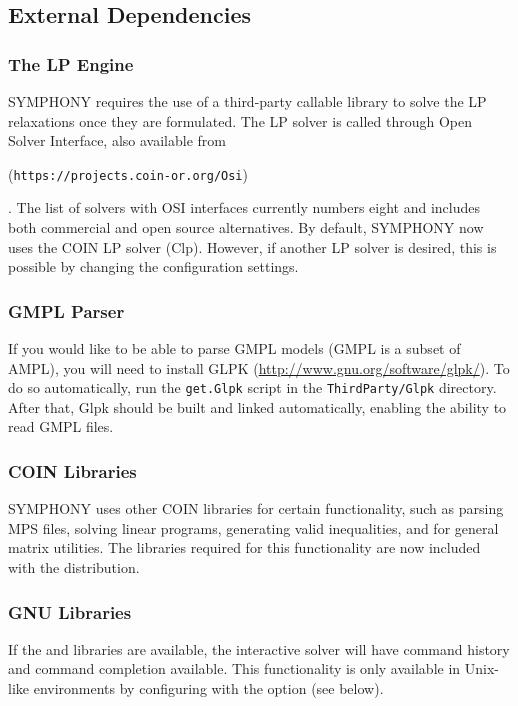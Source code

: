 \subsection{External Dependencies}

\subsubsection{The LP Engine} SYMPHONY requires the use of a third-party
  callable library to solve the LP relaxations once they are formulated. The
LP solver is called through Open Solver Interface, also available from
\begin{latexonly} 
(\texttt{https://projects.coin-or.org/Osi})
\end{latexonly}.
The list of solvers with OSI interfaces currently numbers eight and includes
both commercial and open source alternatives. By default, SYMPHONY now uses
the COIN LP solver (Clp). However, if another LP solver is desired, this is
possible by changing the configuration settings.

\subsubsection{GMPL Parser} If you would like to be able to parse GMPL models
(GMPL is a subset of AMPL), you will need to install GLPK
(\url{http://www.gnu.org/software/glpk/}). To do so automatically, run the
\texttt{get.Glpk} script in the \texttt{ThirdParty/Glpk} directory. After
that, Glpk should be built and linked automatically, enabling the ability to
read GMPL files.

\subsubsection{COIN Libraries} SYMPHONY uses other COIN libraries for certain
functionality, such as parsing MPS files, solving linear programs, generating
valid inequalities, and for general matrix utilities. The libraries required
for this functionality are now included with the distribution.

\subsubsection{GNU Libraries} If the  and  libraries
are available, the interactive solver will have command history and command
completion available. This functionality is only available in Unix-like
environments by configuring with the  option (see
below).

